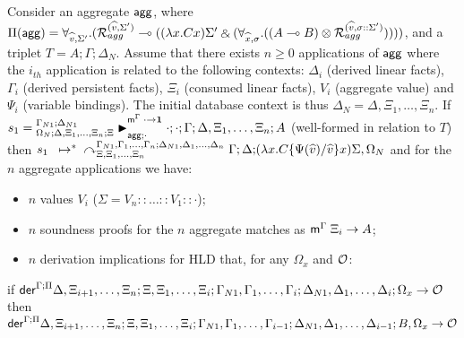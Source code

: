 \begin{theorem}\label{thm:aggregates}

Consider an aggregate $\mathsf{agg}$, where $\Pi(\mathsf{agg}) = \forall_{\widehat{v}, \Sigma'}.
  (\mathcal{R}_{agg}^{(\widehat{v}, \Sigma')} \multimap ((\lambda x. C x)\Sigma' \mathbin{\binampersand} (\forall_{\widehat{x}, \sigma}.
                                               ((A \multimap B) \otimes
                                                \mathcal{R}_{agg}^{(\widehat{v}, \sigma
                                                ::\Sigma')}))))$,
and a triplet $T = A; \Gamma; \Delta_{N}$.
Assume that there exists $n \geq 0$ applications of $\mathsf{agg}$
where the $i_{th}$ application is related to the following contexts: 
  $\Delta_i$ (derived linear facts), $\Gamma_i$ (derived persistent facts),
  $\Xi_i$ (consumed linear facts),
  $V_i$ (aggregate value) and
  $\Psi_i$ (variable bindings).
The initial database context is thus $\Delta_N = \Delta, \Xi_1, \dotsc, \Xi_n$.
If $s_1 = {{}^{\Gamma_{N1}; \Delta_{N1}}_{\Omega_N ; \Delta, \Xi_1, \dotsc, \Xi_n ; \Xi}\blacktriangleright}_{\mathsf{agg} ; \cdot}^{\mathsf{m}^\Gamma \; \cdot \rightarrow \mathbf{1}} \; \cdot;
  \cdot; \Gamma; \Delta, \Xi_1, \dotsc, \Xi_n; A$
  (well-formed in relation to $T$) then $\transs{s_1}{\derstatex{\Gamma}{\Delta}{\Xi, \Xi_1, \dotsc, \Xi_n}{\Gamma_{N1},                                              \Gamma_1, \dotsc, \Gamma_n}{\Delta_{N1}, \Delta_1, \dotsc,
        \Delta_n}{$\\$ (\lambda x.  C\{\Psi(\widehat{v})/\widehat{v}\} x) \Sigma,
           \Omega_N}}$ and for the $n$ aggregate applications we have:
\begin{itemize}[leftmargin=*]
     \item $n$ values $V_i$ ($\Sigma = V_n :: \dots :: V_1 :: \cdot$);
     \item $n$ soundness proofs for the $n$ aggregate matches as $\mathsf{m}^{\Gamma} \; \Xi_i \rightarrow A$;

     \item $n$ derivation implications for HLD that, for any $\Omega_x$ and
        $\mathcal{O}$:
  \end{itemize}
  \vspace{-2mm}
        {\small if $\mathsf{der}^{\Gamma ; \Pi} \Delta, \Xi_{i+1}, \dotsc, \Xi_{n} ; \Xi, \Xi_1,
        \dotsc, \Xi_i; \Gamma_{N1}, \Gamma_1, \dotsc, \Gamma_i; \Delta_{N1},
           \Delta_1, \dotsc, \Delta_i; \Omega_x \rightarrow \mathcal{O}$ then \\
              $\mathsf{der}^{\Gamma ; \Pi} \Delta, \Xi_{i+1}, \dotsc, \Xi_{n} ; \Xi, \Xi_1,
              \dotsc, \Xi_i; \Gamma_{N1}, \Gamma_1, \dotsc, \Gamma_{i-1}; \Delta_{N1},
              \Delta_1, \dotsc, \Delta_{i-1}; B, \Omega_x \rightarrow \mathcal{O}$}

\end{theorem}

